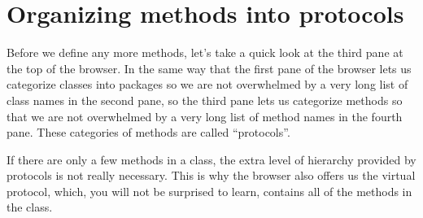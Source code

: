 \documentclass[a4paper,10pt,twoside]{book}
\begin{document}



\section{Organizing methods into protocols}

Before we define any more methods, let's take a quick look at the third pane at the top of the browser.
In the same way that the first pane of the browser lets us categorize classes into packages so we are not overwhelmed by a very long list of class names in the second pane, so the third pane lets us categorize methods so that we are not overwhelmed by a very long list of method names in the fourth pane.   
These categories of methods are called ``protocols''.

If there are only a few methods in a class, the extra level of hierarchy provided by protocols is not really necessary.
This is why the browser also offers us the  virtual protocol, which, you will not be surprised to learn, contains all of the methods in the class.
\end{document}
